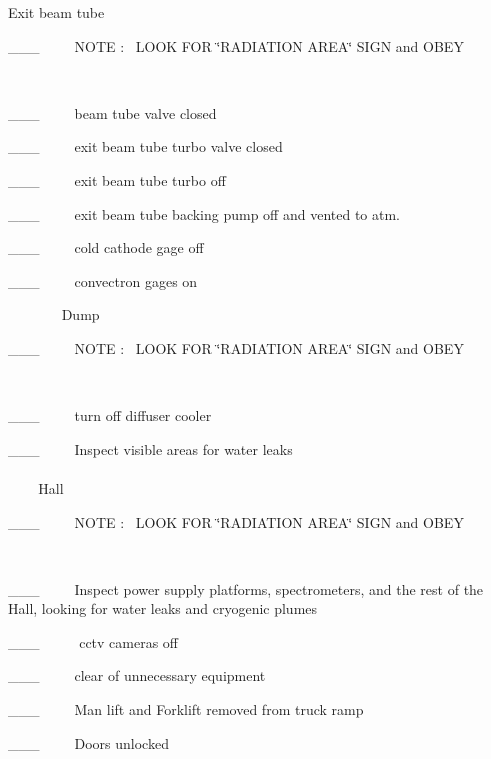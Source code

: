 Exit beam tube

\_\_\_~~~~~NOTE :~ LOOK FOR \char`\"{}RADIATION AREA\char`\"{} SIGN and OBEY

~

\_\_\_~~~~~beam tube valve closed 

\_\_\_~~~~~exit beam tube turbo valve closed

\_\_\_~~~~~exit beam tube turbo off 

\_\_\_~~~~~exit beam tube backing pump off and vented to atm.

\_\_\_~~~~~cold cathode gage off

\_\_\_~~~~~convectron gages on

~
~
~
~
~Dump

\_\_\_~~~~~NOTE :~ LOOK FOR \char`\"{}RADIATION AREA\char`\"{} SIGN and OBEY

~

\_\_\_~~~~~turn off diffuser cooler

\_\_\_~~~~~Inspect visible areas for water leaks
\\
\\
~
~
~Hall 

\_\_\_~~~~~NOTE :~ LOOK FOR \char`\"{}RADIATION AREA\char`\"{} SIGN and OBEY

~

\_\_\_~~~~~Inspect power supply platforms, spectrometers, and the rest of the
Hall, looking for water leaks and cryogenic plumes

\_\_\_~~~~~ cctv cameras off

\_\_\_~~~~~clear of unnecessary equipment

\_\_\_~~~~~Man lift and Forklift removed from truck ramp

\_\_\_~~~~~Doors unlocked

~

~

%
